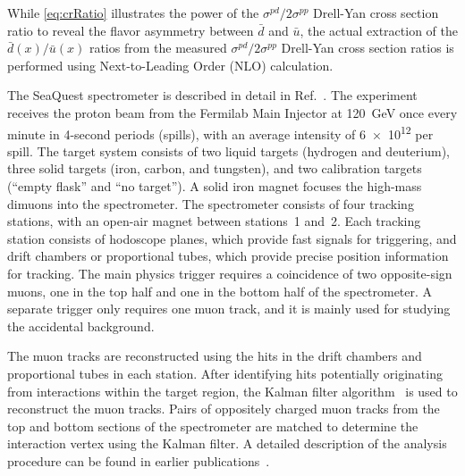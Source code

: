 \documentclass[reprint,aps,unsortedaddress,superscriptaddress,prl,floatfix,showpacs,linenumbers]{revtex4-2}
\begin{document}
While \cref{eq:crRatio} illustrates the power of the $\sigma^{pd}/2\sigma^{pp}$ Drell-Yan cross section
ratio to reveal the flavor asymmetry between $\bar{d}$ and $\bar{u}$,
the actual extraction of the $\bar{d}\left(x\right) / \bar{u}\left(x\right)$
ratios from the measured $\sigma^{pd}/ 2 \sigma^{pp}$ Drell-Yan cross
section ratios is performed using Next-to-Leading Order (NLO)
calculation.

The SeaQuest spectrometer is described in detail in Ref.~\cite{aidala2019}.
The experiment receives the proton beam from the Fermilab Main
Injector at \SI{120}{\GeV}
once every minute in 4-second periods (spills), with an average intensity
of \num{6e12} per spill.
The target system consists of two liquid targets (hydrogen and deuterium),
three solid targets (iron, carbon, and tungsten), and two calibration
targets (``empty flask'' and ``no target'').
A solid iron magnet focuses the high-mass dimuons into the spectrometer.
The spectrometer consists of four tracking stations, with an open-air magnet between stations~1 and~2.
Each tracking station consists of hodoscope planes, which
provide fast signals for triggering,
and drift chambers or proportional tubes, which provide precise
position information for tracking.
The main physics trigger requires a coincidence of two opposite-sign muons,
one in the top half and one in the bottom half of the spectrometer.
A separate trigger only requires one muon track, and it is mainly used
for studying the accidental background.

The muon tracks are reconstructed using the hits in the drift chambers and proportional tubes in each station.
After identifying hits potentially originating from interactions within the target region,
the Kalman filter algorithm~\cite{kalman1960} is used to reconstruct the muon tracks.
Pairs of oppositely charged muon tracks from the top and bottom sections of the spectrometer are
matched to determine the interaction vertex using the Kalman filter.
A detailed description of the analysis procedure can be found in earlier publications~\cite{dove2021,dove2023}.
\end{document}
